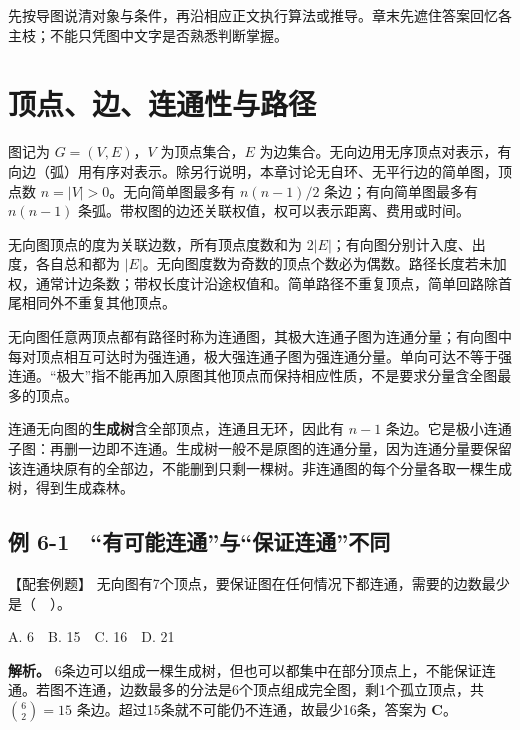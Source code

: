先按导图说清对象与条件，再沿相应正文执行算法或推导。章末先遮住答案回忆各主枝；不能只凭图中文字是否熟悉判断掌握。

\section{顶点、边、连通性与路径}\label{DS06-01}

\begin{definition}[图与本章模型]

图记为 \(G=(V,E)\)，\(V\) 为顶点集合，\(E\) 为边集合。无向边用无序顶点对表示，有向边（弧）用有序对表示。除另行说明，本章讨论无自环、无平行边的简单图，顶点数 \(n=|V|>0\)。无向简单图最多有 \(n(n-1)/2\) 条边；有向简单图最多有 \(n(n-1)\) 条弧。带权图的边还关联权值，权可以表示距离、费用或时间。

\end{definition}

无向图顶点的度为关联边数，所有顶点度数和为 \(2|E|\)；有向图分别计入度、出度，各自总和都为 \(|E|\)。无向图度数为奇数的顶点个数必为偶数。路径长度若未加权，通常计边条数；带权长度计沿途权值和。简单路径不重复顶点，简单回路除首尾相同外不重复其他顶点。

无向图任意两顶点都有路径时称为连通图，其极大连通子图为连通分量；有向图中每对顶点相互可达时为强连通，极大强连通子图为强连通分量。单向可达不等于强连通。``极大''指不能再加入原图其他顶点而保持相应性质，不是要求分量含全图最多的顶点。

连通无向图的\textbf{生成树}含全部顶点，连通且无环，因此有 \(n-1\) 条边。它是极小连通子图：再删一边即不连通。生成树一般不是原图的连通分量，因为连通分量要保留该连通块原有的全部边，不能删到只剩一棵树。非连通图的每个分量各取一棵生成树，得到生成森林。

\subsection{例 6-1　``有可能连通''与``保证连通''不同}\label{DS06-ex1}

\begin{example}[配套案例]

【配套例题】 无向图有7个顶点，要保证图在任何情况下都连通，需要的边数最少是（　）。

A. 6　B. 15　C. 16　D. 21

\end{example}

\textbf{解析。} 6条边可以组成一棵生成树，但也可以都集中在部分顶点上，不能保证连通。若图不连通，边数最多的分法是6个顶点组成完全图，剩1个孤立顶点，共 \(\binom62=15\) 条边。超过15条就不可能仍不连通，故最少16条，答案为 \textbf{C}。


